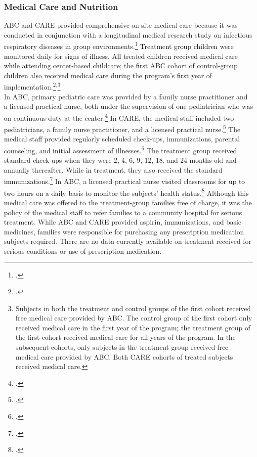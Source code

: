 \begin{appendices}
\subsubsection{Medical Care and Nutrition}
ABC and CARE provided comprehensive on-site medical care because it was conducted in conjunction with a longitudinal medical research study on infectious respiratory diseases in group environments.\footnote{\citet{Henderson-et-al_1982_NEJoM}.} Treatment group children were monitored daily for signs of illness. All treated children received medical care while attending center-based childcare; the first ABC cohort of control-group children also received medical care during the program's first year of implementation.\footnote{\citet{Ramey_Collier_etal_1976_CarolinaAbecedarianProject, Bryant_et_al_1987_Carolina_Approach_TIECSE, Ramey_Campbell_1991_childreninpoverty,Campbell_Ramey_1994_CD}.}$^{,}$\footnote{Subjects in both the treatment and control groups of the first cohort received free medical care provided by ABC. The control group of the first cohort only received medical care in the first year of the program; the treatment group of the first cohort received medical care for all years of the program. In the subsequent cohorts, only subjects in the treatment group received free medical care provided by ABC. Both CARE cohorts of treated subjects received medical care.}\\

\noindent In ABC, primary pediatric care was provided by a family nurse practitioner and a licensed practical nurse, both under the supervision of one pediatrician who was on continuous duty at the center.\footnote{\citet{Haskins-et-al_1978_JoPP}.} In CARE, the medical staff included two pediatricians, a family nurse practitioner, and a licensed practical nurse.\footnote{\citet{Bryant_et_al_1987_Carolina_Approach_TIECSE}.} The medical staff provided regularly scheduled check-ups, immunizations, parental counseling, and initial assessment of illnesses.\footnote{\citet{Ramey-et-al_1977_Intro-to-ABC, Bryant_et_al_1987_Carolina_Approach_TIECSE}.} The treatment group received standard check-ups when they were 2, 4, 6, 9, 12, 18, and 24 months old and annually thereafter. While in treatment, they also received the standard immunizations.\footnote{\citet{Bryant_et_al_1987_Carolina_Approach_TIECSE, Campbell_Conti_etal_2014_EarlyChildhoodInvestments}.} In ABC, a licensed practical nurse visited classrooms for up to two hours on a daily basis to monitor the subjects' health status.\footnote{\citet{Sanyal_Henderson_etal_1980_JoPediatrics}.} Although this medical care was offered to the treatment-group families free of charge, it was the policy of the medical staff to refer families to a community hospital for serious treatment. While ABC and CARE provided aspirin, immunizations, and basic medicines, families were responsible for purchasing any prescription medication subjects required. There are no data currently available on treatment received for serious conditions or use of prescription medication.  \\


\end{appendices}
